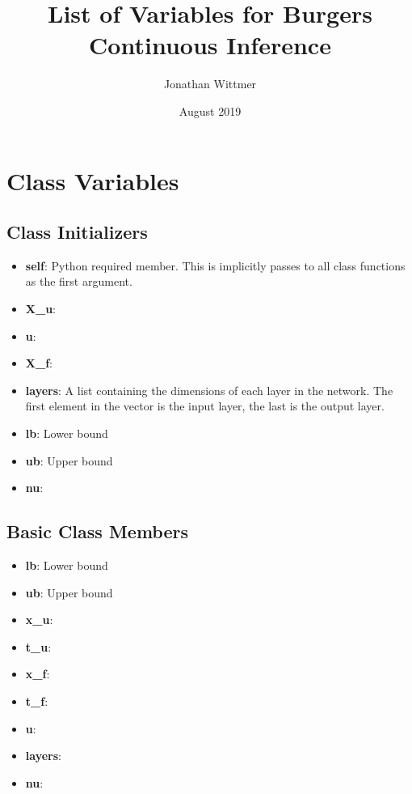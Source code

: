 \documentclass[10pt]{article}
\title{List of Variables for Burgers Continuous Inference}
\author{Jonathan Wittmer}
\date{August 2019}
\begin{document}
\maketitle

\section{Class Variables}
\subsection{Class Initializers}
\begin{itemize}
	\item \textbf{self}: Python required member. This is implicitly passes to all class functions as the first argument.
	\item \textbf{X\_u}: 
	\item \textbf{u}:
	\item \textbf{X\_f}:
	\item \textbf{layers}: A list containing the dimensions of each layer in the network. The first element in the vector is the input layer, the last is the output layer. 
	\item \textbf{lb}: Lower bound
	\item \textbf{ub}: Upper bound
	\item \textbf{nu}:
\end{itemize}


\subsection{Basic Class Members}

\begin{itemize}
	\item \textbf{lb}: Lower bound
	\item \textbf{ub}: Upper bound
	\item \textbf{x\_u}: 
	\item \textbf{t\_u}:
	\item \textbf{x\_f}:
	\item \textbf{t\_f}:
	\item \textbf{u}:
	\item \textbf{layers}:
	\item \textbf{nu}:
		
\end{itemize}
\end{document}
